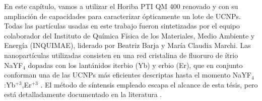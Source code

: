 

En este capítulo, vamos a utilizar el Horiba PTI QM 400 renovado y con su ampliación de capacidades para caracterizar ópticamente un lote de UCNPs.
Todas las partículas usadas en este trabajo fueron sintetizadas por el equipo colaborador del Instituto de Química Física de los Materiales, Medio Ambiente y Energía (INQUIMAE), liderado por Beatriz Barja y María Claudia Marchi. 
Las nanopartículas utilizadas consisten en una red cristalina de fluoruro de ítrio NaYF$_4$ dopadas con los lantánidos iterbio (Yb) y erbio (Er), que en conjunto conforman una de las UCNPs más eficientes descriptas hasta el momento NaYF$_4$:Yb$^{+3}$,Er$^{+3}$ \cite{caracterizacion_ucnps_unicas}.
El método de síntensis empleado escapa el alcance de esta tésis, pero está detalladamente documentado en la literatura \cite{Zhang2012}.

